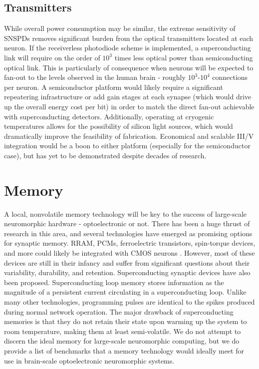 \documentclass[conference]{IEEEtran}
\begin{document}
\subsection{Transmitters}
While overall power consumption may be similar, the extreme sensitivity of SNSPDs removes significant burden from the optical transmitters located at each neuron. If the receiverless photodiode scheme is implemented, a superconducting link will require on the order of $10^3$ times less optical power than semiconducting optical link. This is particularly of consequence when neurons will be expected to fan-out to the levels observed in the human brain - roughly $10^3$-$10^4$ connections per neuron. A semiconductor platform would likely require a significant repeatering infrastructure or add gain stages at each synapse (which would drive up the overall energy cost per bit) in order to match the direct fan-out achievable with superconducting detectors. Additionally, operating at cryogenic temperatures allows for the possibility of silicon light sources, which would dramatically improve the feasibility of fabrication. Economical and scalable III/V integration would be a boon to either platform (especially for the semiconductor case), but has yet to be demonstrated despite decades of research. 

\section{Memory}
A local, nonvolatile memory technology will be key to the success of large-scale neuromorphic hardware - optoelectronic or not. There has been a huge thrust of research in this area, and several technologies have emerged as promising options for synaptic memory. RRAM, PCMs, ferroelectric transistors, spin-torque devices, and more could likely be integrated with CMOS neurons \cite{upadhyay2019emerging}. However, most of these devices are still in their infancy and suffer from significant questions about their variability, durability, and retention. Superconducting synaptic devices have also been proposed. Superconducting loop memory stores information as the magnitude of a persistent current circulating in a superconducting loop. Unlike many other technologies, programming pulses are identical to the spikes produced during normal network operation. The major drawback of superconducting memories is that they do not retain their state upon warming up the system to room temperature, making them at least semi-volatile. We do not attempt to discern the ideal memory for large-scale neuromorphic computing, but we do provide a list of benchmarks that a memory technology would ideally meet for use in brain-scale optoelectronic neuromorphic systems.
\end{document}
